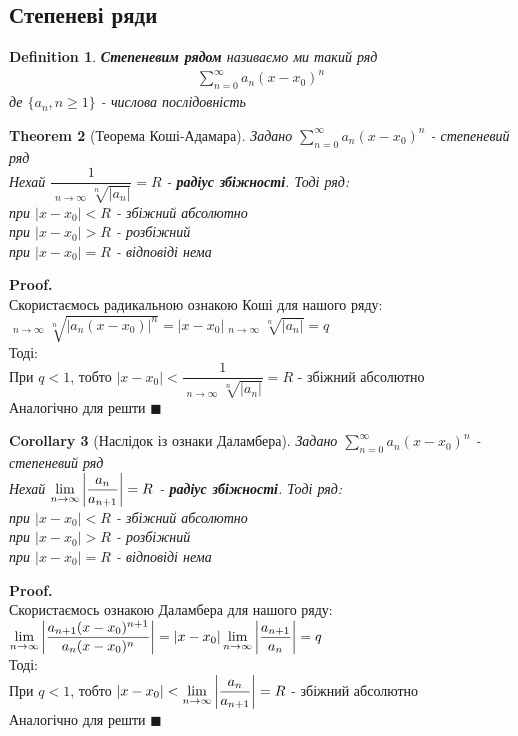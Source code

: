 \documentclass[a4paper, 14pt]{extarticle}
\DeclareMathOperator*\uplim{\overline{lim}}
\def\huge{\displaystyle}
\theoremstyle{theoremdd}
\newtheorem{theorem}{Theorem}[subsection]
\theoremstyle{theoremdd}
\newtheorem{definition}[theorem]{Definition}
\theoremstyle{theoremdd}
\theoremstyle{theoremdd}
\theoremstyle{theoremdd}
\theoremstyle{theoremdd}
\theoremstyle{theoremdd}
\theoremstyle{theoremdd}
\newtheorem{corollary}[theorem]{Corollary}
\newenvironment{pf}{\vspace*{-3mm} \textbf{Proof. \\}}{$\blacksquare$}
\begin{document}
\subsection{Степеневі ряди}
\begin{definition}
\textbf{Степеневим рядом} називаємо ми такий ряд
\begin{align*}
\sum_{n=0}^\infty a_n(x-x_0)^n
\end{align*}
де $\{a_n, n \geq 1\}$ - числова послідовність
\end{definition}

\begin{theorem}[Теорема Коші-Адамара]
Задано $\huge \sum_{n=0}^\infty a_n(x-x_0)^n$ - степеневий ряд\\
Нехай $\dfrac{1}{\huge \uplim_{n \to \infty} \sqrt[n]{|a_n|}} = R$ - \textbf{радіус збіжності}. Тоді ряд:\\
при $|x-x_0|<R$ - збіжний абсолютно\\
при $|x-x_0|>R$ - розбіжний\\
при $|x-x_0|=R$ - відповіді нема
\end{theorem}

\begin{pf}
Скористаємось радикальною ознакою Коші для нашого ряду:\\
$\huge \uplim_{n \to \infty} \sqrt[n]{|a_n(x-x_0)|^n} = |x-x_0| \uplim_{n \to \infty} \sqrt[n]{|a_n|} = q$\\
Тоді:\\
При $q < 1$, тобто $|x-x_0| < \dfrac{1}{\huge \uplim_{n \to \infty} \sqrt[n]{|a_n|}} = R$ - збіжний абсолютно\\
Аналогічно для решти
\end{pf}

\begin{corollary}[Наслідок із ознаки Даламбера]
Задано $\huge \sum_{n=0}^\infty a_n(x-x_0)^n$ - степеневий ряд\\
Нехай $\huge \lim_{n \to \infty} \abs{\dfrac{a_n}{a_{n+1}}} = R$ - \textbf{радіус збіжності}. Тоді ряд:\\
при $|x-x_0|<R$ - збіжний абсолютно\\
при $|x-x_0|>R$ - розбіжний\\
при $|x-x_0|=R$ - відповіді нема
\end{corollary}

\begin{pf}
Скористаємось ознакою Даламбера для нашого ряду:\\
$\huge \lim_{n \to \infty} \abs{\dfrac{a_{n+1}(x-x_0)^{n+1}}{a_n(x-x_0)^n}} = |x-x_0| \lim_{n \to \infty} \abs{\dfrac{a_{n+1}}{a_n}} = q$\\
Тоді:\\
При $q < 1$, тобто $|x-x_0| < \huge \lim_{n \to \infty} \abs{\dfrac{a_n}{a_{n+1}}} = R$ - збіжний абсолютно\\
Аналогічно для решти
\end{pf}
\end{document}
